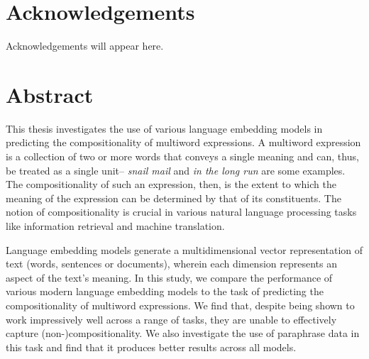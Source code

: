 \documentclass[12pt,a4paper]{report}
\begin{document}
\chapter*{\centering \LARGE Acknowledgements}
Acknowledgements will appear here.

\chapter*{\centering \LARGE Abstract}
This thesis investigates the use of various language embedding models in predicting the compositionality of multiword expressions. 
A multiword expression is a collection of two or more words that conveys a single meaning and can, thus, be treated as a single unit-- \textit{snail mail} and \textit{in the long run} are some examples. The compositionality of such an expression, then, is the extent to which the meaning of the expression can be determined by that of its constituents. The notion of compositionality is crucial in various natural language processing tasks like information retrieval and machine translation.

 Language embedding models generate a multidimensional vector representation of text (words, sentences or documents), wherein each dimension represents an aspect of the text's meaning. In this study, we compare the performance of various modern language embedding models to the task of predicting the compositionality of multiword expressions. We find that, despite being shown to work impressively well across a range of tasks, they are unable to effectively capture (non-)compositionality. We also investigate the use of paraphrase data in this task and find that it produces better results across all models.
\end{document}
